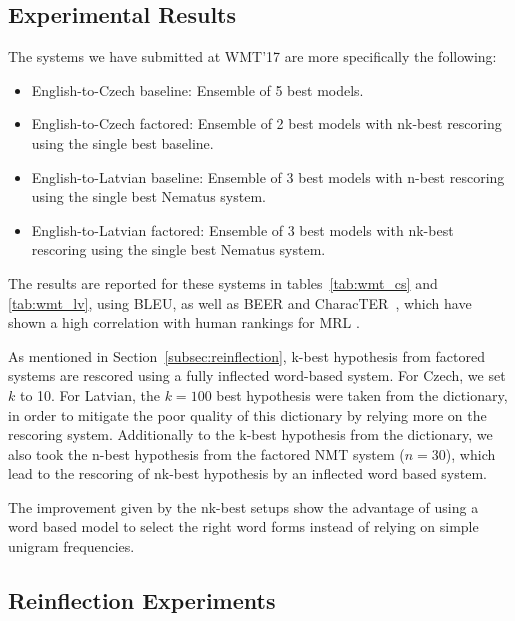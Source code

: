 \documentclass[11pt,letterpaper,final]{article}
\begin{document}
\subsection{Experimental Results}
\label{subsec:res_fnmt}

The systems we have submitted at WMT'17 are more specifically the following:

\begin{itemize}
  \item English-to-Czech baseline: Ensemble of 5 best models.
  \item English-to-Czech factored: Ensemble of 2 best models with nk-best rescoring using the single best baseline.
  \item English-to-Latvian baseline: Ensemble of 3 best models with n-best rescoring using the single best Nematus system.
  \item English-to-Latvian factored: Ensemble of 3 best models with nk-best rescoring using the single best Nematus system.
\end{itemize}


The results are reported for these systems in tables~\ref{tab:wmt_cs} and \ref{tab:wmt_lv}, using BLEU, as well as BEER \cite{stanojevic2014beer} and CharacTER~\cite{wang2016character}, which have shown a high correlation with human rankings for MRL \cite{bojar2016metrics}.

As mentioned in Section~\ref{subsec:reinflection}, k-best
hypothesis from factored systems are rescored using a
fully inflected word-based system. For Czech, we set
$k$ to 10. For Latvian, the $k=100$ best
hypothesis were taken from the dictionary, in order
to mitigate the poor quality of this dictionary
by relying more on the rescoring system.
Additionally to the k-best hypothesis from the dictionary,
we also took the n-best hypothesis from the factored
NMT system ($n=30$), which lead to the rescoring of nk-best
hypothesis by an inflected word based system.

The improvement given by the nk-best setups show
the advantage of using a word based model to select
the right word forms instead of relying on simple
unigram frequencies.


\subsection{Reinflection Experiments}
\label{subsec:reinflection_exp}
\end{document}
